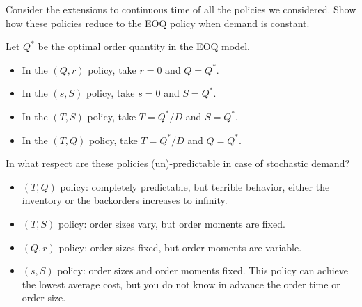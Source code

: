 \begin{exercise}
  Consider the extensions to continuous time of all the policies we considered. Show how these policies reduce to the EOQ policy when demand is constant. 
  \begin{solution}
Let $Q^*$ be the optimal order quantity in the EOQ model.  
\begin{itemize}
\item In the  $(Q,r)$ policy, take $r=0$ and $Q=Q^*$.
\item In the  $(s,S)$ policy, take $s=0$ and $S=Q^*$.
\item In the  $(T,S)$ policy, take $T=Q^*/D$ and $S=Q^*$.
\item In the  $(T,Q)$ policy, take $T=Q^*/D$ and $Q=Q^*$.
\end{itemize}
  \end{solution}
\end{exercise}

\begin{exercise}
  In what respect are these policies (un)-predictable in case of stochastic demand?
  \begin{solution}
\begin{itemize}
\item $(T,Q)$ policy: completely predictable, but terrible behavior, either the inventory or the backorders increases to infinity. 
\item $(T,S)$ policy: order sizes vary, but order moments are fixed.
\item $(Q,r)$ policy: order sizes fixed, but order moments are variable.
\item $(s,S)$ policy: order sizes and  order moments fixed. This policy can achieve the lowest average cost,  but you do not know in advance the order time or order size. 
\end{itemize}
  \end{solution}
\end{exercise}

